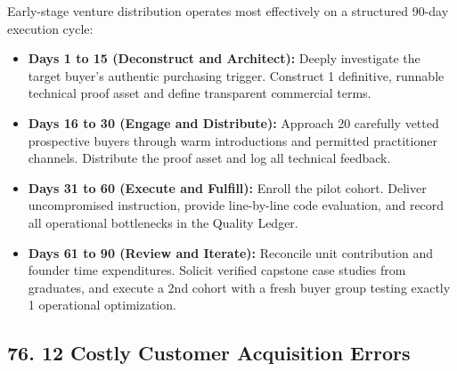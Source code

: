 Early-stage venture distribution operates most effectively on a structured 90-day execution cycle:
\begin{itemize}[leftmargin=*,itemsep=1pt]
  \item \textbf{Days 1 to 15 (Deconstruct and Architect):} Deeply investigate the target buyer's authentic purchasing trigger. Construct 1 definitive, runnable technical proof asset and define transparent commercial terms.
  \item \textbf{Days 16 to 30 (Engage and Distribute):} Approach 20 carefully vetted prospective buyers through warm introductions and permitted practitioner channels. Distribute the proof asset and log all technical feedback.
  \item \textbf{Days 31 to 60 (Execute and Fulfill):} Enroll the pilot cohort. Deliver uncompromised instruction, provide line-by-line code evaluation, and record all operational bottlenecks in the Quality Ledger.
  \item \textbf{Days 61 to 90 (Review and Iterate):} Reconcile unit contribution and founder time expenditures. Solicit verified capstone case studies from graduates, and execute a 2nd cohort with a fresh buyer group testing exactly 1 operational optimization.
\end{itemize}

\subsection*{76. 12 Costly Customer Acquisition Errors}

